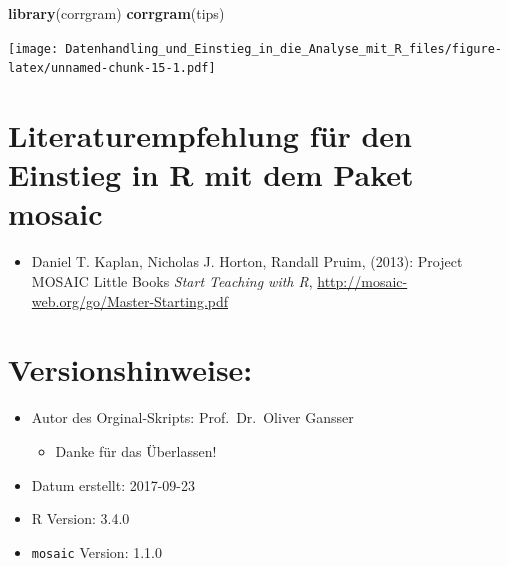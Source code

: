 \documentclass[10pt,ngerman,onside]{article}
\newenvironment{Shaded}{\begin{snugshade}}{\end{snugshade}}
\newcommand{\KeywordTok}[1]{\textcolor[rgb]{0.13,0.29,0.53}{\textbf{#1}}}
\newcommand{\NormalTok}[1]{#1}
\providecommand{\tightlist}{%
  \setlength{\itemsep}{0pt}\setlength{\parskip}{0pt}}
\begin{document}
\begin{Shaded}
\begin{Highlighting}[]
\KeywordTok{library}\NormalTok{(corrgram)}
\KeywordTok{corrgram}\NormalTok{(tips)}
\end{Highlighting}
\end{Shaded}

\texttt{[image: Datenhandling\_und\_Einstieg\_in\_die\_Analyse\_mit\_R\_files/figure-latex/unnamed-chunk-15-1.pdf]}

\newpage

\hypertarget{literaturempfehlung-fur-den-einstieg-in-r-mit-dem-paket-mosaic}{%
\section{Literaturempfehlung für den Einstieg in R mit dem Paket
mosaic}\label{literaturempfehlung-fur-den-einstieg-in-r-mit-dem-paket-mosaic}}

\begin{itemize}
\tightlist
\item
  Daniel T. Kaplan, Nicholas J. Horton, Randall Pruim, (2013): Project
  MOSAIC Little Books \emph{Start Teaching with R},
  \url{http://mosaic-web.org/go/Master-Starting.pdf}
\end{itemize}

\hypertarget{versionshinweise}{%
\section{Versionshinweise:}\label{versionshinweise}}

\begin{itemize}
\tightlist
\item
  Autor des Orginal-Skripts: Prof.~Dr.~Oliver Gansser

  \begin{itemize}
  \tightlist
  \item
    Danke für das Überlassen!
  \end{itemize}
\item
  Datum erstellt: 2017-09-23
\item
  R Version: 3.4.0
\item
  \texttt{mosaic} Version: 1.1.0
\end{itemize}
\end{document}

